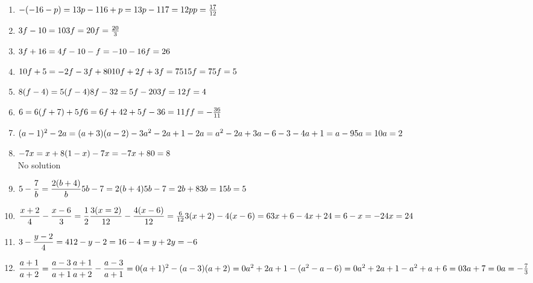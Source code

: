\begin{solutions}{}
{\begin{enumerate}[itemsep=5pt, label=\textbf{\arabic*}. ]
\begin{enumerate}[itemsep=6pt, label=\textbf{\arabic*}. ]
\item   $-(-16-p)=13p-1\\16+p=13p-1\\17=12p\\p=\frac{17}{12}$
\item   $3f-10=10\\3f=20\\f=\frac{20}{3}$
\item   $3f+16=4f-10\\-f=-10-16\\f=26$
\item   $10f+5=-2f-3f+80\\10f+2f+3f=75\\15f=75\\f=5$
\item   $8(f-4)=5(f-4)\\8f-32=5f-20\\3f=12\\f=4$
\item  $6=6(f+7)+5f\\6=6f+42+5f\\-36=11f\\f=-\frac{36}{11}$      
\item $(a-1)^{2} - 2a = (a+3)(a-2) - 3\\a^2-2a+1-2a=a^2-2a+3a-6-3\\-4a+1=a-9\\5a=10\\a=2$
\item $-7x = x+8(1-x)\\-7x=-7x+8\\0=8$\\ No solution 
\item $5-\dfrac{7}{b} = \dfrac{2(b+4)}{b}\\[4pt]5b-7=2(b+4)\\[4pt]5b-7=2b+8\\3b=15\\b=5$
\item $\dfrac{x+2}{4} - \dfrac{x-6}{3} = \dfrac{1}{2}\\[4pt]\dfrac{3(x=2)}{12}-\dfrac{4(x-6)}{12}=\frac{6}{12}\\[4pt]3(x+2)-4(x-6)=6\\[4pt]3x+6-4x+24=6\\-x=-24\\x=24$
\item $ 3 - \dfrac{y-2}{4} = 4\\[4pt]12-y-2=16\\-4=y+2\\y=-6$
\item $ \dfrac{a+1}{a+2} = \dfrac{a-3}{a+1}\\[4pt]\dfrac{a+1}{a+2} - \dfrac{a-3}{a+1}=0\\[4pt](a+1)^2 -(a-3)(a+2)=0\\a^2+2a+1-(a^2-a-6)=0\\a^2+2a+1-a^2+a+6=0\\3a+7=0\\a=-\frac{7}{3}$
\end{enumerate}


\end{enumerate}}
\end{solutions}

